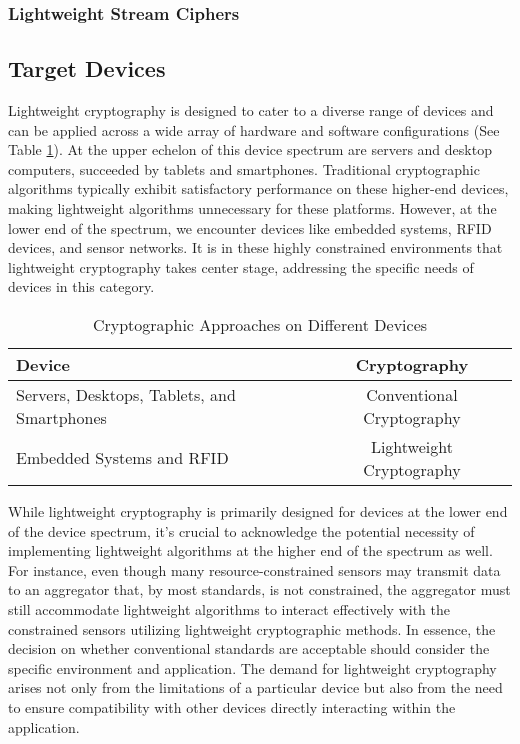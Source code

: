 \documentclass[conference,compsoc]{IEEEtran}
\begin{document}
\subsubsection{Lightweight Stream Ciphers} 
\subsection{Target Devices}
Lightweight cryptography is designed to cater to a diverse range of devices and can be applied across a wide array of hardware and software configurations (See Table \ref{table:crypto_devices}). At the upper echelon of this device spectrum are servers and desktop computers, succeeded by tablets and smartphones. Traditional cryptographic algorithms typically exhibit satisfactory performance on these higher-end devices, making lightweight algorithms unnecessary for these platforms. However, at the lower end of the spectrum, we encounter devices like embedded systems, RFID devices, and sensor networks. It is in these highly constrained environments that lightweight cryptography takes center stage, addressing the specific needs of devices in this category.

\begin{table}[h]
    \centering
    \begin{tabular}{lc}
        \toprule
        \textbf{Device} & \textbf{Cryptography} \\
        \midrule
        Servers, Desktops, Tablets, and Smartphones & Conventional Cryptography \\
        Embedded Systems and RFID & Lightweight Cryptography \\
        \bottomrule
    \end{tabular}
    \caption{Cryptographic Approaches on Different Devices}
    \label{table:crypto_devices}
\end{table}

While lightweight cryptography is primarily designed for devices at the lower end of the device spectrum, it's crucial to acknowledge the potential necessity of implementing lightweight algorithms at the higher end of the spectrum as well. For instance, even though many resource-constrained sensors may transmit data to an aggregator that, by most standards, is not constrained, the aggregator must still accommodate lightweight algorithms to interact effectively with the constrained sensors utilizing lightweight cryptographic methods. In essence, the decision on whether conventional standards are acceptable should consider the specific environment and application. The demand for lightweight cryptography arises not only from the limitations of a particular device but also from the need to ensure compatibility with other devices directly interacting within the application.
\end{document}

